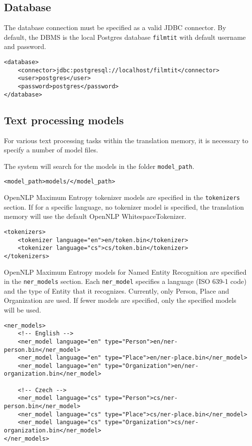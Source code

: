\subsection{Database}

The database connection must be specified as a valid JDBC connector. By default, the DBMS is the local Postgres database \verb#filmtit# with default username and password.

\begin{lstlisting}
<database>
    <connector>jdbc:postgresql://localhost/filmtit</connector>
    <user>postgres</user>
    <password>postgres</password>
</database>
\end{lstlisting}

\subsection{Text processing models}

For various text processing tasks within the translation memory, 
it is necessary to specify a number of model files.

The system will search for the models in the folder \verb#model_path#.
\begin{lstlisting}
<model_path>models/</model_path>
\end{lstlisting}

OpenNLP Maximum Entropy tokenizer models are specified in the \verb#tokenizers# section. If for a specific language, no tokenizer model is specified, the translation memory will use the default OpenNLP WhitespaceTokenizer.
\begin{lstlisting}
<tokenizers>
    <tokenizer language="en">en/token.bin</tokenizer>
    <tokenizer language="cs">cs/token.bin</tokenizer>
</tokenizers>
\end{lstlisting}

OpenNLP Maximum Entropy models for Named Entity Recognition are specified in the \verb#ner_models# section. Each \verb#ner_model# specifies a language (ISO 639-1 code) and the type of Entity that it recognizes. Currently, only Person, Place and Organization are used. If fewer models are specified, only the specified models will be used.

\begin{lstlisting}
<ner_models>
    <!-- English -->
    <ner_model language="en" type="Person">en/ner-person.bin</ner_model>
    <ner_model language="en" type="Place">en/ner-place.bin</ner_model>
    <ner_model language="en" type="Organization">en/ner-organization.bin</ner_model>

    <!-- Czech -->
    <ner_model language="cs" type="Person">cs/ner-person.bin</ner_model>
    <ner_model language="cs" type="Place">cs/ner-place.bin</ner_model>
    <ner_model language="cs" type="Organization">cs/ner-organization.bin</ner_model>
</ner_models>
\end{lstlisting}

